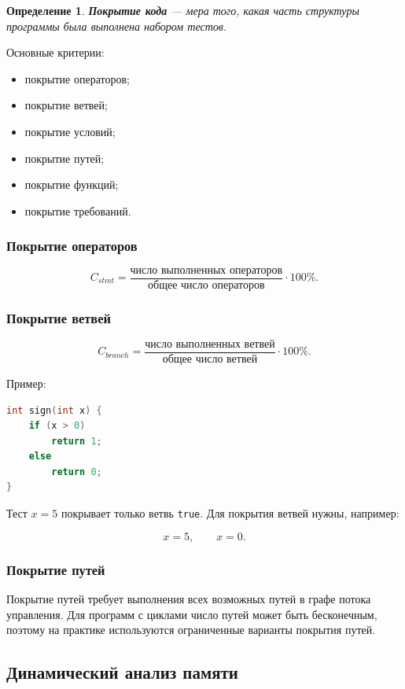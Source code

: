\documentclass[12pt,a4paper]{article}
\newtheorem{definition}{Определение}
\begin{document}
\begin{definition}
\textbf{Покрытие кода} --- мера того, какая часть структуры программы была выполнена набором тестов.
\end{definition}

Основные критерии:

\begin{itemize}
  \item покрытие операторов;
  \item покрытие ветвей;
  \item покрытие условий;
  \item покрытие путей;
  \item покрытие функций;
  \item покрытие требований.
\end{itemize}

\subsubsection{Покрытие операторов}

\[
C_{stmt} = \frac{\text{число выполненных операторов}}{\text{общее число операторов}} \cdot 100\%.
\]

\subsubsection{Покрытие ветвей}

\[
C_{branch} = \frac{\text{число выполненных ветвей}}{\text{общее число ветвей}} \cdot 100\%.
\]

Пример:

\begin{lstlisting}[language=C]
int sign(int x) {
    if (x > 0)
        return 1;
    else
        return 0;
}
\end{lstlisting}

Тест $x=5$ покрывает только ветвь \texttt{true}. Для покрытия ветвей нужны, например:

\[
x=5,\qquad x=0.
\]

\subsubsection{Покрытие путей}

Покрытие путей требует выполнения всех возможных путей в графе потока управления. Для программ с циклами число путей может быть бесконечным, поэтому на практике используются ограниченные варианты покрытия путей.

\subsection{Динамический анализ памяти}
\end{document}
